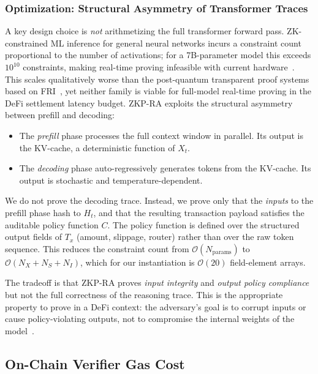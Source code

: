 \documentclass[final,5p,times,twocolumn]{elsarticle}
\theoremstyle{plain}
\theoremstyle{definition}
\theoremstyle{remark}
\begin{document}
\subsubsection{Optimization: Structural Asymmetry of Transformer Traces}
A key design choice is \emph{not} arithmetizing the full transformer forward
pass. ZK-constrained ML inference for general neural networks incurs a
constraint count proportional to the number of activations; for a 7B-parameter
model this exceeds $10^{10}$ constraints, making real-time proving infeasible
with current hardware~\cite{peng2025survey,chen2024zkml}. This scales
qualitatively worse than the post-quantum transparent proof systems based on
FRI~\cite{bensasson2018stark}, yet neither family is viable for full-model
real-time proving in the DeFi settlement latency budget. ZKP-RA exploits the
structural asymmetry between prefill and decoding:

\begin{itemize}
  \item The \emph{prefill} phase processes the full context window in parallel.
        Its output is the KV-cache, a deterministic function of $X_t$.
  \item The \emph{decoding} phase auto-regressively generates tokens from the
        KV-cache. Its output is stochastic and temperature-dependent.
\end{itemize}

We do not prove the decoding trace. Instead, we prove only that the \emph{inputs}
to the prefill phase hash to $H_t$, and that the resulting transaction payload
satisfies the auditable policy function $C$. The policy function is defined
over the structured output fields of $T_x$ (amount, slippage, router) rather
than over the raw token sequence. This reduces the constraint count from
$\mathcal{O}(N_{\mathrm{params}})$ to $\mathcal{O}(N_X + N_S + N_I)$, which
for our instantiation is $\mathcal{O}(20)$ field-element arrays.

The tradeoff is that ZKP-RA proves \emph{input integrity} and \emph{output
policy compliance} but not the full correctness of the reasoning trace. This
is the appropriate property to prove in a DeFi context: the adversary's goal
is to corrupt inputs or cause policy-violating outputs, not to compromise the
internal weights of the model~\cite{verillm2025}.

\subsection{On-Chain Verifier Gas Cost}
\label{sec:gas}
\end{document}
